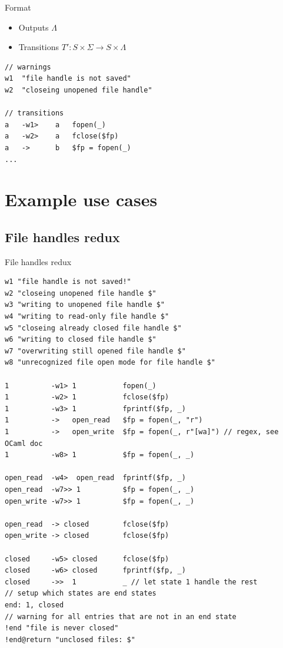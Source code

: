 \documentclass{beamer}
\newcommand{\inlineC}[1]{\lstinline[language=C]$#1$}
\begin{document}
\begin{frame}[fragile]{Format}
\begin{itemize}
\item Outputs $\Lambda$
\item Transitions $T' : S \times \Sigma \to S \times \Lambda$
\end{itemize}
\begin{lstlisting}
// warnings
w1  "file handle is not saved"
w2  "closeing unopened file handle"

// transitions
a   -w1>    a   fopen(_)
a   -w2>    a   fclose($fp)
a   ->      b   $fp = fopen(_)
...
\end{lstlisting}
\end{frame}


\section{Example use cases}

\subsection{File handles redux}

\begin{frame}[fragile]{File handles redux}
\begin{lstlisting}[basicstyle=\tiny\ttfamily,]
w1 "file handle is not saved!"
w2 "closeing unopened file handle $"
w3 "writing to unopened file handle $"
w4 "writing to read-only file handle $"
w5 "closeing already closed file handle $"
w6 "writing to closed file handle $"
w7 "overwriting still opened file handle $"
w8 "unrecognized file open mode for file handle $"

1          -w1> 1           fopen(_)
1          -w2> 1           fclose($fp)
1          -w3> 1           fprintf($fp, _)
1          ->   open_read   $fp = fopen(_, "r")
1          ->   open_write  $fp = fopen(_, r"[wa]") // regex, see OCaml doc
1          -w8> 1           $fp = fopen(_, _)

open_read  -w4>  open_read  fprintf($fp, _)
open_read  -w7>> 1          $fp = fopen(_, _)
open_write -w7>> 1          $fp = fopen(_, _)

open_read  -> closed        fclose($fp)
open_write -> closed        fclose($fp)

closed     -w5> closed      fclose($fp)
closed     -w6> closed      fprintf($fp, _)
closed     ->>  1           _ // let state 1 handle the rest
// setup which states are end states
end: 1, closed
// warning for all entries that are not in an end state
!end "file is never closed"
!end@return "unclosed files: $"
\end{lstlisting}
\end{frame}
\end{document}
